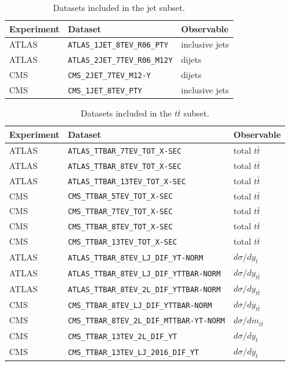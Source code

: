 \documentclass[11pt,a4paper]{article}
\begin{document}
\begin{table}[htbp]
\centering
\small
\begin{tabular}{lll}
\toprule
Experiment & Dataset & Observable \\
\midrule
ATLAS & \texttt{ATLAS\_1JET\_8TEV\_R06\_PTY} & inclusive jets \\
ATLAS & \texttt{ATLAS\_2JET\_7TEV\_R06\_M12Y} & dijets \\
CMS & \texttt{CMS\_2JET\_7TEV\_M12-Y} & dijets \\
CMS & \texttt{CMS\_1JET\_8TEV\_PTY} & inclusive jets \\
\bottomrule
\end{tabular}
\caption{Datasets included in the jet subset.}
\label{tab:jet}
\end{table}

\begin{table}[htbp]
\centering
\small
\begin{tabular}{lll}
\toprule
Experiment & Dataset & Observable \\
\midrule
ATLAS & \texttt{ATLAS\_TTBAR\_7TEV\_TOT\_X-SEC} & total $t\bar{t}$ \\
ATLAS & \texttt{ATLAS\_TTBAR\_8TEV\_TOT\_X-SEC} & total $t\bar{t}$ \\
ATLAS & \texttt{ATLAS\_TTBAR\_13TEV\_TOT\_X-SEC} & total $t\bar{t}$ \\
CMS & \texttt{CMS\_TTBAR\_5TEV\_TOT\_X-SEC} & total $t\bar{t}$ \\
CMS & \texttt{CMS\_TTBAR\_7TEV\_TOT\_X-SEC} & total $t\bar{t}$ \\
CMS & \texttt{CMS\_TTBAR\_8TEV\_TOT\_X-SEC} & total $t\bar{t}$ \\
CMS & \texttt{CMS\_TTBAR\_13TEV\_TOT\_X-SEC} & total $t\bar{t}$ \\
ATLAS & \texttt{ATLAS\_TTBAR\_8TEV\_LJ\_DIF\_YT-NORM} & $d\sigma/dy_t$ \\
ATLAS & \texttt{ATLAS\_TTBAR\_8TEV\_LJ\_DIF\_YTTBAR-NORM} & $d\sigma/dy_{t\bar{t}}$ \\
ATLAS & \texttt{ATLAS\_TTBAR\_8TEV\_2L\_DIF\_YTTBAR-NORM} & $d\sigma/dy_{t\bar{t}}$ \\
CMS & \texttt{CMS\_TTBAR\_8TEV\_LJ\_DIF\_YTTBAR-NORM} & $d\sigma/dy_{t\bar{t}}$ \\
CMS & \texttt{CMS\_TTBAR\_8TEV\_2L\_DIF\_MTTBAR-YT-NORM} & $d\sigma/dm_{t\bar{t}}$ \\
CMS & \texttt{CMS\_TTBAR\_13TEV\_2L\_DIF\_YT} & $d\sigma/dy_t$ \\
CMS & \texttt{CMS\_TTBAR\_13TEV\_LJ\_2016\_DIF\_YT} & $d\sigma/dy_t$ \\
\bottomrule
\end{tabular}
\caption{Datasets included in the $t\bar{t}$ subset.}
\label{tab:tt}
\end{table}
\end{document}
